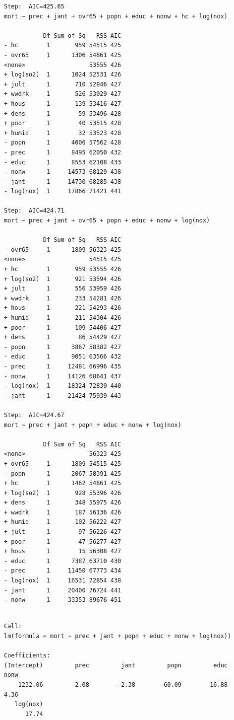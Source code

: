 \documentclass[
]{book}
\begin{document}
\begin{verbatim}
Step:  AIC=425.65
mort ~ prec + jant + ovr65 + popn + educ + nonw + hc + log(nox)

           Df Sum of Sq   RSS AIC
- hc        1       959 54515 425
- ovr65     1      1306 54861 425
<none>                  53555 426
+ log(so2)  1      1024 52531 426
+ jult      1       710 52846 427
+ wwdrk     1       526 53029 427
+ hous      1       139 53416 427
+ dens      1        59 53496 428
+ poor      1        40 53515 428
+ humid     1        32 53523 428
- popn      1      4006 57562 428
- prec      1      8495 62050 432
- educ      1      8553 62108 433
- nonw      1     14573 68129 438
- jant      1     14730 68285 438
- log(nox)  1     17866 71421 441

Step:  AIC=424.71
mort ~ prec + jant + ovr65 + popn + educ + nonw + log(nox)

           Df Sum of Sq   RSS AIC
- ovr65     1      1809 56323 425
<none>                  54515 425
+ hc        1       959 53555 426
+ log(so2)  1       921 53594 426
+ jult      1       556 53959 426
+ wwdrk     1       233 54281 426
+ hous      1       221 54293 426
+ humid     1       211 54304 426
+ poor      1       109 54406 427
+ dens      1        86 54429 427
- popn      1      3867 58382 427
- educ      1      9051 63566 432
- prec      1     12481 66996 435
- nonw      1     14126 68641 437
- log(nox)  1     18324 72839 440
- jant      1     21424 75939 443

Step:  AIC=424.67
mort ~ prec + jant + popn + educ + nonw + log(nox)

           Df Sum of Sq   RSS AIC
<none>                  56323 425
+ ovr65     1      1809 54515 425
- popn      1      2067 58391 425
+ hc        1      1462 54861 425
+ log(so2)  1       928 55396 426
+ dens      1       348 55975 426
+ wwdrk     1       187 56136 426
+ humid     1       102 56222 427
+ jult      1        97 56226 427
+ poor      1        47 56277 427
+ hous      1        15 56308 427
- educ      1      7387 63710 430
- prec      1     11450 67773 434
- log(nox)  1     16531 72854 438
- jant      1     20400 76724 441
- nonw      1     33353 89676 451
\end{verbatim}

\begin{verbatim}

Call:
lm(formula = mort ~ prec + jant + popn + educ + nonw + log(nox))

Coefficients:
(Intercept)         prec         jant         popn         educ         nonw  
    1232.06         2.08        -2.38       -60.09       -16.88         4.36  
   log(nox)  
      17.74  
\end{verbatim}
\end{document}
